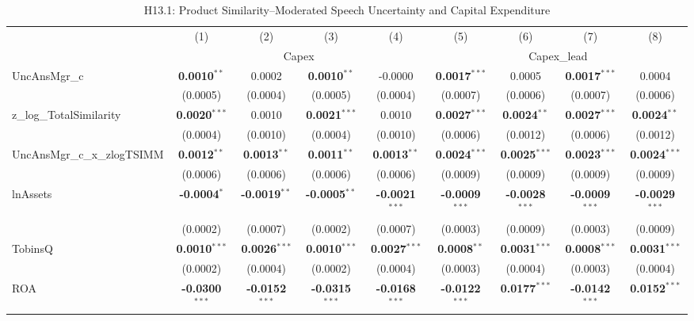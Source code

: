 \begin{landscape}
\begin{table}[H]
\setlength{\tabcolsep}{3pt}
\renewcommand{\arraystretch}{0.85}
\centering
\caption{H13.1: Product Similarity--Moderated Speech Uncertainty and Capital Expenditure}
\label{tab:h13_1}
\scriptsize
\begin{tabular}{lcccccccc}
\toprule
 & (1) & (2) & (3) & (4) & (5) & (6) & (7) & (8) \\
 & \multicolumn{4}{c}{Capex} & \multicolumn{4}{c}{Capex\_lead} \\
\cmidrule(lr){2-5} \cmidrule(lr){6-9}
\midrule
UncAnsMgr\_c & \textbf{0.0010}$^{**}$ & 0.0002 & \textbf{0.0010}$^{**}$ & -0.0000 & \textbf{0.0017}$^{***}$ & 0.0005 & \textbf{0.0017}$^{***}$ & 0.0004 \\
 & (0.0005) & (0.0004) & (0.0005) & (0.0004) & (0.0007) & (0.0006) & (0.0007) & (0.0006) \\
z\_log\_TotalSimilarity & \textbf{0.0020}$^{***}$ & 0.0010 & \textbf{0.0021}$^{***}$ & 0.0010 & \textbf{0.0027}$^{***}$ & \textbf{0.0024}$^{**}$ & \textbf{0.0027}$^{***}$ & \textbf{0.0024}$^{**}$ \\
 & (0.0004) & (0.0010) & (0.0004) & (0.0010) & (0.0006) & (0.0012) & (0.0006) & (0.0012) \\
UncAnsMgr\_c\_x\_zlogTSIMM & \textbf{0.0012}$^{**}$ & \textbf{0.0013}$^{**}$ & \textbf{0.0011}$^{**}$ & \textbf{0.0013}$^{**}$ & \textbf{0.0024}$^{***}$ & \textbf{0.0025}$^{***}$ & \textbf{0.0023}$^{***}$ & \textbf{0.0024}$^{***}$ \\
 & (0.0006) & (0.0006) & (0.0006) & (0.0006) & (0.0009) & (0.0009) & (0.0009) & (0.0009) \\
\midrule
lnAssets & \textbf{-0.0004}$^{*}$ & \textbf{-0.0019}$^{**}$ & \textbf{-0.0005}$^{**}$ & \textbf{-0.0021}$^{***}$ & \textbf{-0.0009}$^{***}$ & \textbf{-0.0028}$^{***}$ & \textbf{-0.0009}$^{***}$ & \textbf{-0.0029}$^{***}$ \\
 & (0.0002) & (0.0007) & (0.0002) & (0.0007) & (0.0003) & (0.0009) & (0.0003) & (0.0009) \\
TobinsQ & \textbf{0.0010}$^{***}$ & \textbf{0.0026}$^{***}$ & \textbf{0.0010}$^{***}$ & \textbf{0.0027}$^{***}$ & \textbf{0.0008}$^{**}$ & \textbf{0.0031}$^{***}$ & \textbf{0.0008}$^{***}$ & \textbf{0.0031}$^{***}$ \\
 & (0.0002) & (0.0004) & (0.0002) & (0.0004) & (0.0003) & (0.0004) & (0.0003) & (0.0004) \\
ROA & \textbf{-0.0300}$^{***}$ & \textbf{-0.0152}$^{***}$ & \textbf{-0.0315}$^{***}$ & \textbf{-0.0168}$^{***}$ & \textbf{-0.0122}$^{***}$ & \textbf{0.0177}$^{***}$ & \textbf{-0.0142}$^{***}$ & \textbf{0.0152}$^{***}$ \\

\end{tabular}
\end{table}
\end{landscape}
